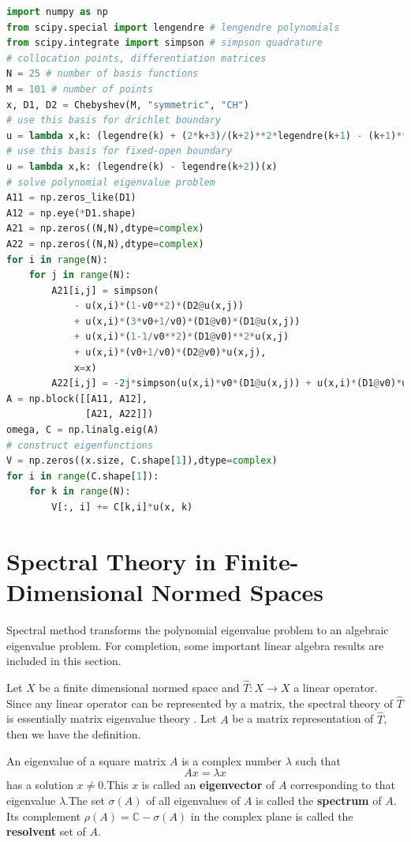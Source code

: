 \begin{lstlisting}[language=Python, float, floatplacement=H, caption={Pseudocode for solving polynomial eigenvalue problem using Lengendre-Galerkin method}, label=code:spectral-galerkin]
import numpy as np
from scipy.special import lengendre # lengendre polynomials
from scipy.integrate import simpson # simpson quadrature
# collocation points, differentiation matrices
N = 25 # number of basis functions
M = 101 # number of points
x, D1, D2 = Chebyshev(M, "symmetric", "CH")
# use this basis for drichlet boundary
u = lambda x,k: (legendre(k) + (2*k+3)/(k+2)**2*legendre(k+1) - (k+1)**2/(k+2)**2*legendre(k+2))(x)
# use this basis for fixed-open boundary
u = lambda x,k: (legendre(k) - legendre(k+2))(x)
# solve polynomial eigenvalue problem
A11 = np.zeros_like(D1)
A12 = np.eye(*D1.shape)
A21 = np.zeros((N,N),dtype=complex)
A22 = np.zeros((N,N),dtype=complex)
for i in range(N):
    for j in range(N):
		A21[i,j] = simpson(
			- u(x,i)*(1-v0**2)*(D2@u(x,j))
			+ u(x,i)*(3*v0+1/v0)*(D1@v0)*(D1@u(x,j))
			+ u(x,i)*(1-1/v0**2)*(D1@v0)**2*u(x,j) 
			+ u(x,i)*(v0+1/v0)*(D2@v0)*u(x,j),
			x=x)
		A22[i,j] = -2j*simpson(u(x,i)*v0*(D1@u(x,j)) + u(x,i)*(D1@v0)*u(x,j),x=x)
A = np.block([[A11, A12],
              [A21, A22]])
omega, C = np.linalg.eig(A)
# construct eigenfunctions
V = np.zeros((x.size, C.shape[1]),dtype=complex)
for i in range(C.shape[1]):
    for k in range(N):
        V[:, i] += C[k,i]*u(x, k)
\end{lstlisting}


\section{Spectral Theory in Finite-Dimensional Normed Spaces}
Spectral method transforms the polynomial eigenvalue problem to an algebraic eigenvalue problem. For completion, some important linear algebra results are included in this section.

Let $X$ be a finite dimensional normed space and $\hat{T}: X \to X$ a linear operator. Since any linear operator can be represented by a matrix, the spectral theory of $\hat{T}$ is essentially matrix eigenvalue theory \cite{kreyszig_introductory_1978}. Let $A$ be a matrix representation of $\hat{T}$, then we have the definition.

\begin{definition} 
	An eigenvalue of a square matrix $A$ is a complex number $\lambda$ such that
	\[ Ax = \lambda x \]
	has a solution $x\neq 0$.This $x$ is called an \textbf{eigenvector} of $A$ corresponding to that eigenvalue $\lambda$.The set $\sigma(A)$ of all eigenvalues of $A$ is called the \textbf{spectrum} of $A$. Its complement $\rho(A) = \mathbb{C}-\sigma(A)$ in the complex plane is called the \textbf{resolvent} set of $A$.
\end{definition}

